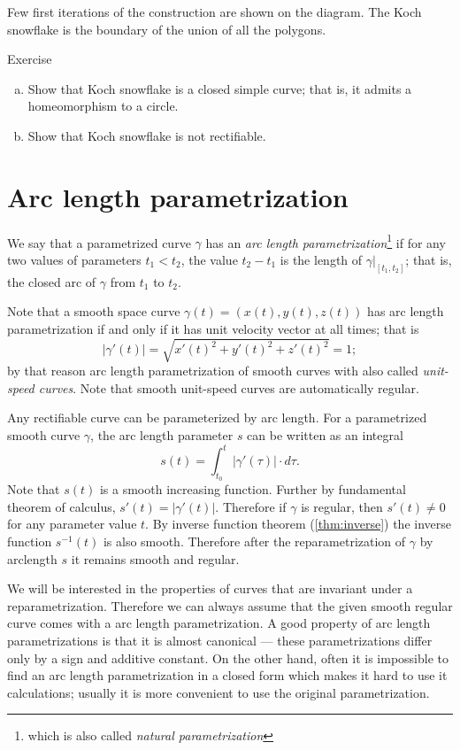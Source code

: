 Few first iterations of the construction are shown on the diagram.
The Koch snowflake is the boundary of the union of all the polygons.


\begin{thm}{Exercise}\label{ex:nonrectifiable-curve}
\begin{enumerate}[(a)]
\item Show that Koch snowflake is a closed simple curve; that is, it admits a homeomorphism to a circle.
\item\label{ex:nonrectifiable-curve:b} Show that Koch snowflake is not rectifiable. 
\end{enumerate}
\end{thm}

\section*{Arc length parametrization}

We say that a parametrized curve $\gamma$ has an \emph{arc length parametrization}\footnote{which is also called \emph{natural parametrization}}
if for any two values of parameters $t_1<t_2$, the value $t_2-t_1$ is the length of $\gamma|_{[t_1,t_2]}$; that is, the closed arc of $\gamma$ from $t_1$ to $t_2$.

Note that a smooth space curve $\gamma(t)=(x(t),y(t),z(t))$ has arc length parametrization if and only if it has unit velocity vector at all times;
that is 
\[|\gamma'(t)|=\sqrt{x'(t)^2+y'(t)^2+z'(t)^2}=1;\]
by that reason arc length parametrization of smooth curves with also called \emph{unit-speed curves}.
Note that smooth unit-speed curves are automatically regular.


Any rectifiable curve can be parameterized by arc length.
For a parametrized smooth curve $\gamma$, the arc length parameter $s$ can be written as an integral
\[s(t)=\int_{t_0}^t |\gamma'(\tau)|\cdot d\tau.\]
Note that $s(t)$ is a smooth increasing function.
Further by fundamental theorem of calculus, $s'(t)=|\gamma'(t)|$.
Therefore if $\gamma$ is regular, then $s'(t)\ne0$ for any parameter value $t$.
By inverse function theorem (\ref{thm:inverse}) the inverse function $s^{-1}(t)$ is also smooth.
Therefore after the reparametrization of $\gamma$ by arclength  $s$ it remains smooth and regular.

We will be interested in the properties of curves that are invariant under a reparametrization.
Therefore we can always assume that the given smooth regular curve comes with a arc length parametrization.
A good property of arc length parametrizations is that it is almost canonical --- these parametrizations differ only by a sign and additive constant.
On the other hand, often it is impossible to find an arc length parametrization in a closed form which makes it hard to use it calculations;
usually it is more convenient to use the original parametrization.

